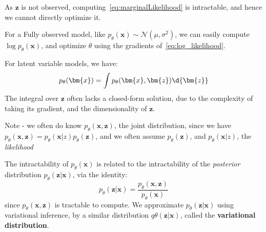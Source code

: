 \documentclass{article}
\begin{document}
\begin{remark} As $\bm{z}$ is not observed, computing~\cref{eq:marginalLikelihood} is intractable, and hence we cannot directly optimize it. 

  For a Fully observed model, like $p_{\theta}(\bm{x}) \sim \mathcal{N}( \mu, \sigma ^2)$, we can easily compute $\log p_{\theta}(\bm{x})$, and optimize $\theta$ using the gradients of~\ref{eq:log_likelihood}. 

For latent variable models, we have:
\[
  p_{\theta}(\bm{x}) = \int p_{\theta}(\bm{x}, \bm{z}) \d{\bm{z}}
\]
The integral over $\bm{z}$ often lacks a closed-form solution, due to the complexity of taking its gradient,  and the dimensionality of $\bm{z}$. 

  Note - we often do know $p_{\theta}(\bm{x}, \bm{z})$, the joint distribution, since we have $p_{\theta}(\bm{x}, \bm{z}) =  p_{\theta}(\bm{x} | z) p_{\theta}(\bm{z})$, and we often assume $p_{\theta}(\bm{z})$, and $p_{\theta}(\bm{x} | z)$, the \textit{likelihood} 

The intractability of $p_{\theta}(\bm{x})$ is related to the intractability of the \textit{posterior} distribution $p_{\theta}(\bm{z} | \bm{x})$, via the identity:
\[
  p_{\theta}(\bm{z} | \bm{x}) = \frac{p_{\theta}(\bm{x}, \bm{z})}{ p_{\theta}(\bm{x})}
\]
  since $p_{\theta}(\bm{x}, \bm{z})$ is tractable to compute. We approximate $p_{\theta}(\bm{z} | \bm{x})$ using variational inference, by a similar distribution $q \theta(\bm{z} | \bm{x})$, called the \textbf{variational distribution}. 
\end{remark}
\end{document}
